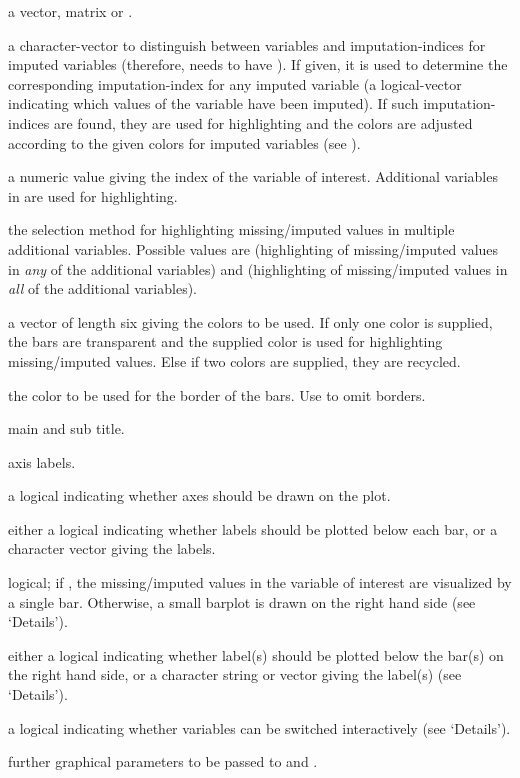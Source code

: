 \begin{Arguments}
\begin{ldescription}
\item[\code{x}] a vector, matrix or .
\item[\code{delimiter}] a character-vector to distinguish between variables
and imputation-indices for imputed variables (therefore,  needs
to have ). If given, it is used to determine the corresponding
imputation-index for any imputed variable (a logical-vector indicating
which values of the variable have been imputed). If such imputation-indices
are found, they are used for highlighting and the colors are adjusted 
according to the given colors for imputed variables (see ).
\item[\code{pos}] a numeric value giving the index of the variable of 
interest.  Additional variables in  are used for 
highlighting.
\item[\code{selection}] the selection method for highlighting missing/imputed values 
in multiple additional variables.  Possible values are  
(highlighting of missing/imputed values in \emph{any} of the additional 
variables) and  (highlighting of missing/imputed values in 
\emph{all} of the additional variables).
\item[\code{col}] a vector of length six giving the colors to be used. If 
only one color is supplied, the bars are transparent and the 
supplied color is used for highlighting missing/imputed values.
Else if two colors are supplied, they are recycled.
\item[\code{border}] the color to be used for the border of the bars. 
Use  to omit borders.
\item[\code{main, sub}] main and sub title.
\item[\code{xlab, ylab}] axis labels.
\item[\code{axes}] a logical indicating whether axes should be drawn 
on the plot.
\item[\code{labels}] either a logical indicating whether labels should be 
plotted below each bar, or a character vector giving the labels.
\item[\code{only.miss}] logical; if , the missing/imputed values in the 
variable of interest are visualized by a single bar.  Otherwise, a 
small barplot is drawn on the right hand side (see `Details').
\item[\code{miss.labels}] either a logical indicating whether label(s) should 
be plotted below the bar(s) on the right hand side, or a character 
string or vector giving the label(s) (see `Details').
\item[\code{interactive}] a logical indicating whether variables can be 
switched interactively (see `Details').
\item[\code{...}] further graphical parameters to be passed to 
 and .
\end{ldescription}
\end{Arguments}
